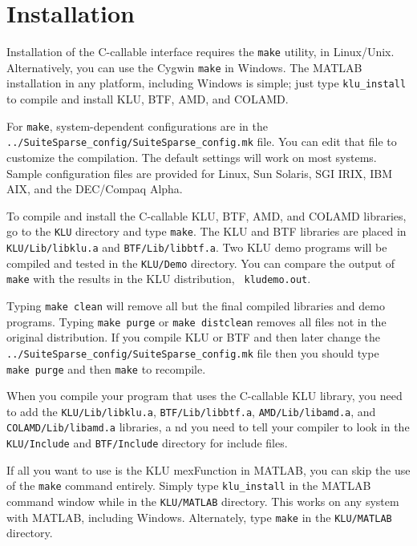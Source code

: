 \documentclass[11pt]{article}
\begin{document}
\section{Installation}
\label{Install}

Installation of the C-callable interface requires the {\tt make} utility, in
Linux/Unix.  Alternatively, you can use the Cygwin {\tt make} in Windows.
The MATLAB installation in any platform, including Windows is simple; just
type {\tt klu\_install} to compile and install KLU, BTF, AMD, and COLAMD.

For {\tt make}, system-dependent configurations are in the {\tt
../SuiteSparse\_config/SuiteSparse\_config.mk} file.
You can edit that file to customize the
compilation.  The default settings will work on most systems.  Sample
configuration files are provided for Linux, Sun Solaris, SGI IRIX, IBM AIX, and
the DEC/Compaq Alpha.

To compile and install the C-callable KLU, BTF, AMD, and COLAMD libraries, go
to the {\tt KLU} directory and type {\tt make}.  The KLU and BTF libraries are
placed in {\tt KLU/Lib/libklu.a} and {\tt BTF/Lib/libbtf.a}.  Two KLU demo
programs will be compiled and tested in the {\tt KLU/Demo} directory.  You can
compare the output of {\tt make} with the results in the KLU distribution, {\tt
kludemo.out}.

Typing {\tt make clean} will remove all but the final compiled libraries and
demo programs.  Typing {\tt make purge} or {\tt make distclean} removes all
files not in the original distribution.  If you compile KLU or BTF and then
later change the {\tt ../SuiteSparse\_config/SuiteSparse\_config.mk}
file then you should type {\tt
make purge} and then {\tt make} to recompile.

When you compile your program that uses the C-callable KLU library, you need to
add the {\tt KLU/Lib/libklu.a}, {\tt BTF/Lib/libbtf.a}, {\tt AMD/Lib/libamd.a},
and {\tt COLAMD/Lib/libamd.a} libraries, a nd you need to tell your compiler to
look in the {\tt KLU/Include} and {\tt BTF/Include} directory for include
files.

If all you want to use is the KLU mexFunction in MATLAB, you can skip the use
of the {\tt make} command entirely.  Simply type {\tt klu\_install} in the
MATLAB command window while in the {\tt KLU/MATLAB} directory.  This works on
any system with MATLAB, including Windows.  Alternately, type {\tt make} in the
{\tt KLU/MATLAB} directory.
\end{document}
